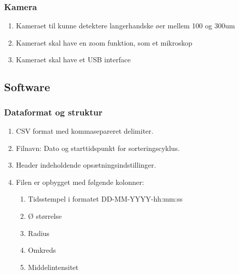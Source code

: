 \subsubsection{Kamera} \label{subsub:camera}
\begin{enumerate}
\item Kameraet til kunne detektere langerhandske øer mellem 100 og 300um
\item Kameraet skal have en zoom funktion, som et mikroskop
\item Kameraet skal have et USB interface
\end{enumerate}


\subsection{Software} 

\subsubsection{Dataformat og struktur} \label{subsub:software}
\begin{enumerate}
\item CSV format med kommasepareret delimiter. 
\item Filnavn: Dato og starttidspunkt for sorteringscyklus.
\item Header indeholdende opsætningsindstillinger.
\item Filen er opbygget med følgende kolonner: 
\begin{enumerate}
\item Tidsstempel i formatet DD-MM-YYYY-hh:mm:ss
\item Ø størrelse
\item Radius
\item Omkreds
\item Middelintensitet
\end{enumerate}
\end{enumerate}

